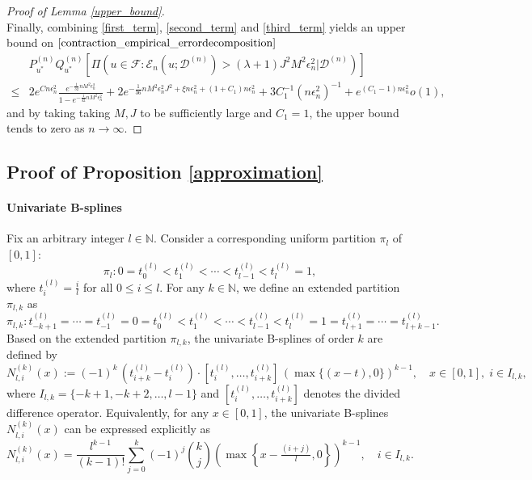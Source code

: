 \documentclass{article}
\newcommand{\F}{\mathcal{F}}
\newcommand{\D}{\mathcal{D}}
\theoremstyle{plain}
\theoremstyle{definition}
\theoremstyle{remark}
\begin{document}
\begin{proof}[Proof of Lemma \ref{upper_bound}]
\begin{equation}
\end{equation}
Finally, combining \eqref{first_term}, \eqref{second_term} and \eqref{third_term} yields an upper bound on $\eqref{contraction_empirical_errordecomposition}$
\begin{equation*}
    \begin{aligned}
        & P_{u^*}^{(n)} Q_{u^*}^{(n)} \left[\Pi(u \in \F: \mathcal{E}_n(u; \D^{(n)}) > (\lambda + 1) J^2 M^2 \epsilon_n^2 | \D^{(n)} )\right] \\ \leq &
         2 e^{C n \epsilon_n^2} \frac{e^{-\frac{1}{32}n M^2 \epsilon_n^2}}{1 - e^{-\frac{1}{32}n M^2 \epsilon_n^2}} + 2e^{-\frac{1}{36} n M^2 \epsilon_{n}^2 J^2 + \xi n\epsilon_n^2 + (1+C_1) n \epsilon_n^2} + 3 C_1^{-1} (n\epsilon_n^2)^{-1} + e^{(C_1 - 1) n\epsilon_n^2} o(1), 
    \end{aligned}
\end{equation*}
and by taking taking $M, J$ to be sufficiently large and $C_1 = 1$, the upper bound tends to zero as $n \to \infty$. 
\end{proof}

\subsection{Proof of Proposition \ref{approximation}} \label{proof_approximation}

\paragraph{Univariate B-splines} Fix an arbitrary integer $l \in \mathbb{N}$. Consider a corresponding uniform partition $\pi_{l}$ of $[0,1]$:
\[
\pi_{l} : 0 = t^{(l)}_{0} < t^{(l)}_{1} < \cdots < t^{(l)}_{l-1} < t^{(l)}_{l} = 1,
\]
where $t^{(l)}_{i} = \frac{i}{l}$ for all $0 \leq i \leq l$.  
For any $k \in \mathbb{N}$, we define an extended partition $\pi_{l,k}$ as
\[
\pi_{l,k} : t^{(l)}_{-k+1} = \cdots = t^{(l)}_{-1} = 0 = t^{(l)}_{0} < t^{(l)}_{1} < \cdots < t^{(l)}_{l-1} < t^{(l)}_{l} = 1 = t^{(l)}_{l+1} = \cdots = t^{(l)}_{l+k-1}.
\]
Based on the extended partition $\pi_{l,k}$, the univariate B-splines of order $k$ are defined by
\begin{equation*} 
N^{(k)}_{l,i}(x) := (-1)^{k}\,(t^{(l)}_{i+k} - t^{(l)}_{i}) \cdot 
[t^{(l)}_{i}, \ldots, t^{(l)}_{i+k}] \, (\max\{ (x - t), 0 \})^{k-1}, 
\quad x \in [0,1], \; i \in I_{l,k},
\end{equation*}
where $I_{l,k} = \{-k+1,-k+2,\ldots,l-1\}$ and $[t^{(l)}_{i}, \ldots, t^{(l)}_{i+k}]$ denotes the divided difference operator.
Equivalently, for any $x \in [0,1]$, the univariate B-splines $N^{(k)}_{l,i}(x)$ can be expressed explicitly as
\begin{equation} \label{univariate_bsplines}
N^{(k)}_{l,i}(x) =
\frac{l^{k-1}}{(k-1)!} \sum_{j=0}^{k} (-1)^{j} \binom{k}{j}
\left(\max\left\{ x - \tfrac{(i+j)}{l}, 0 \right\}\right)^{k-1},  \quad i \in I_{l,k}. 
\end{equation}
\end{document}
